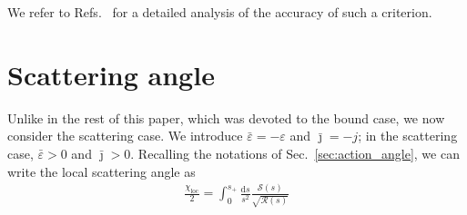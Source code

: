 \documentclass[prd,superscriptaddress,preprintnumbers,tightenlines,nofootinbib, eqsecnum]{revtex4-2}
\renewcommand{\dd}{\mathrm{d}}
\begin{document}
We refer to Refs.~\cite{Blanchet:2025agj, Blanchet:2026wwa} for a detailed analysis of the accuracy of such a criterion.







\section{Scattering angle}
\label{sec:scattering}


Unlike in the rest of this paper, which was devoted to the bound case, we now consider the scattering case. We introduce $\bar\varepsilon=-\varepsilon$ and $\bar{\jmath}=-j$; in the scattering case, $\bar\varepsilon>0$ and $\bar{\jmath}>0$. Recalling the notations of Sec.~\ref{sec:action_angle}, we can write the local scattering angle as
\begin{align}
    \frac{\chi_\text{loc}}{2} = \int_0^{s_+}\frac{\dd s}{s^2} \frac{\mathcal{S}(s)}{\sqrt{\mathcal{R}(s)}}
\end{align}
\end{document}
